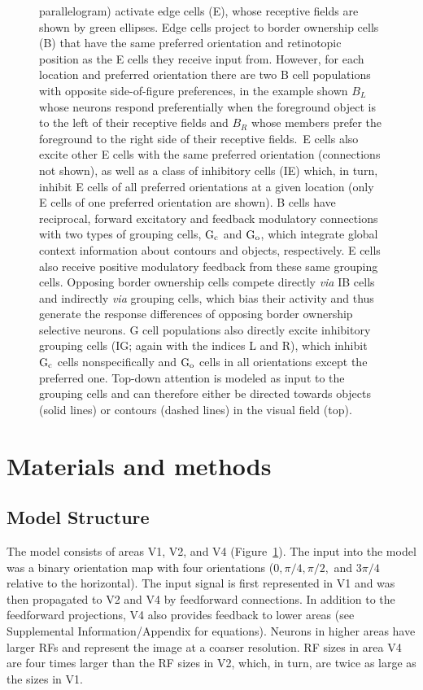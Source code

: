\begin{figure}[htbp]
{parallelogram) activate edge cells (E), whose receptive fields are   shown by green ellipses. Edge cells project to border ownership cells (B) that have the same preferred orientation and retinotopic position as the E cells they receive input from. However, for each location and preferred orientation there are two B cell populations with opposite side-of-figure preferences, in the example shown $B_{L}$ whose neurons respond preferentially when the foreground object is to the left of their receptive fields and $B_{R}$ whose members prefer the foreground to the right side of their receptive fields.\ E cells also excite other E cells with the same preferred orientation (connections not shown),  as well as a class of inhibitory cells (IE) which, in turn, inhibit E cells of all preferred orientations at a given location (only E cells of one preferred orientation are shown). B cells have reciprocal, forward excitatory and feedback modulatory connections with two types of grouping cells, $\rm G_c$ and $\rm G_o$, which integrate global context information about contours and objects, respectively. E cells also receive positive modulatory feedback from these same grouping cells. Opposing border ownership cells compete directly {\em via} IB cells and indirectly {\em via} grouping cells, which bias their activity and thus generate the response differences of opposing border ownership selective neurons. G cell populations also directly excite
inhibitory grouping cells (IG; again with the indices L and R), which inhibit $\rm G_c$ cells nonspecifically and $\rm G_o$ cells in all orientations except the preferred one. Top-down attention is modeled as input to the grouping cells and can therefore either be directed towards objects (solid lines) or contours (dashed lines) in the visual field (top).}
\label{Fig:anatomy}
\end{figure}

\section{Materials and methods} 
\label{sec:model}

\subsection{Model Structure}

The model consists of areas V1, V2, and V4 (Figure~\ref{Fig:anatomy}). The input into the model was a binary orientation map with four orientations ($0, \pi/4, \pi/2,$ and  $3\pi/4$ relative to the horizontal). The input signal is first represented in V1 and was then propagated to V2 and V4 by feedforward connections. In addition to the feedforward projections, V4 also provides feedback to lower areas (see Supplemental Information/Appendix for equations). Neurons in higher areas have larger RFs and represent the image at a coarser resolution. RF sizes in area V4 are four times larger than the RF sizes in V2, which, in turn, are twice as large as the sizes in V1.

